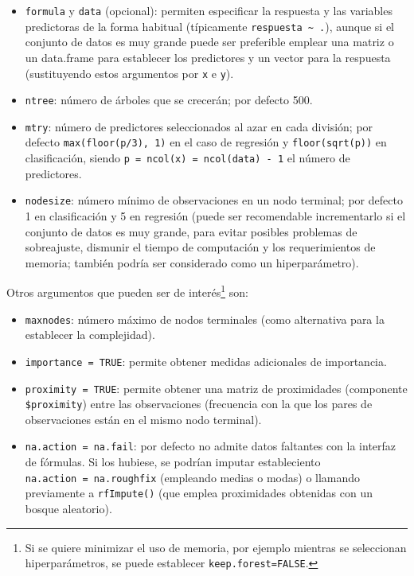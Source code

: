 \documentclass[]{book}
\theoremstyle{break}
\theoremstyle{definition}
\theoremstyle{definition}
\theoremstyle{definition}
\theoremstyle{remark}
\begin{document}
\begin{itemize}
\item
  \texttt{formula} y \texttt{data} (opcional): permiten especificar la
  respuesta y las variables predictoras de la forma habitual
  (típicamente \texttt{respuesta\ \textasciitilde{}\ .}), aunque si el
  conjunto de datos es muy grande puede ser preferible emplear una
  matriz o un data.frame para establecer los predictores y un vector
  para la respuesta (sustituyendo estos argumentos por \texttt{x} e
  \texttt{y}).
\item
  \texttt{ntree}: número de árboles que se crecerán; por defecto 500.
\item
  \texttt{mtry}: número de predictores seleccionados al azar en cada
  división; por defecto \texttt{max(floor(p/3),\ 1)} en el caso de
  regresión y \texttt{floor(sqrt(p))} en clasificación, siendo
  \texttt{p\ =\ ncol(x)\ =\ ncol(data)\ -\ 1} el número de predictores.
\item
  \texttt{nodesize}: número mínimo de observaciones en un nodo terminal;
  por defecto 1 en clasificación y 5 en regresión (puede ser
  recomendable incrementarlo si el conjunto de datos es muy grande, para
  evitar posibles problemas de sobreajuste, dismunir el tiempo de
  computación y los requerimientos de memoria; también podría ser
  considerado como un hiperparámetro).
\end{itemize}

Otros argumentos que pueden ser de interés\footnote{Si se quiere
  minimizar el uso de memoria, por ejemplo mientras se seleccionan
  hiperparámetros, se puede establecer \texttt{keep.forest=FALSE}.} son:

\begin{itemize}
\item
  \texttt{maxnodes}: número máximo de nodos terminales (como alternativa
  para la establecer la complejidad).
\item
  \texttt{importance\ =\ TRUE}: permite obtener medidas adicionales de
  importancia.
\item
  \texttt{proximity\ =\ TRUE}: permite obtener una matriz de
  proximidades (componente \texttt{\$proximity}) entre las observaciones
  (frecuencia con la que los pares de observaciones están en el mismo
  nodo terminal).
\item
  \texttt{na.action\ =\ na.fail}: por defecto no admite datos faltantes
  con la interfaz de fórmulas. Si los hubiese, se podrían imputar
  estableciento \texttt{na.action\ =\ na.roughfix} (empleando medias o
  modas) o llamando previamente a \texttt{rfImpute()} (que emplea
  proximidades obtenidas con un bosque aleatorio).
\end{itemize}
\end{document}

